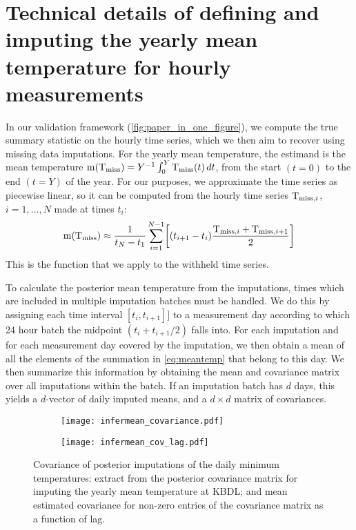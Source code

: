 \section{Technical details of defining and imputing the yearly mean temperature for hourly measurements}
\label{appendix:infermean_details}

In our validation framework (\autoref{fig:paper_in_one_figure}), we compute the true summary statistic
on the hourly time series, which we then aim to recover using missing data imputations.
For the yearly mean temperature, the estimand is the mean temperature $\operatorname{m}(\mathrm{T}_{\mathrm{miss}})=Y^{-1} \int_0^Y \mathrm{T}_{\mathrm{miss}}(t) \mathop{d t}$,
from the start $(t=0)$ to the end $(t=Y)$ of the year.
For our purposes, we approximate the time series as piecewise linear,
so it can be computed from the hourly time series \(\mathrm{T}_{\mathrm{miss},i}\), \(i=1,\dotsc,N\) made at times \(t_i\):
\begin{equation}
    \mean(\Temp_\miss) \approx \frac{1}{t_N - t_1} \sum_{i=1}^{N-1} \sbr{(t_{i+1}-t_i) \frac{\Temp_{\miss,i}+\Temp_{\miss,i+1}}{2}}
    \label{eq:meantemp}
\end{equation}
This is the function that we apply to the withheld time series.

To calculate the posterior mean temperature from the imputations,
times which are included in multiple imputation batches must be handled.
We do this by assigning each time interval $[t_{i},t_{i+1}]]$ to a measurement day
according to which 24 hour batch the midpoint $(t_i+t_{i+1}/2)$ falls into.
For each imputation and for each measurement day covered by the imputation, 
we then obtain a mean of all the elements of the summation in \autoref{eq:meantemp}
that belong to this day.
We then summarize this information by obtaining the mean and covariance matrix
over all imputations within the batch.
If an imputation batch has $d$ days, this yields a $d$-vector of daily imputed means,
and a $d \times d$ matrix of covariances.

\begin{figure}[t]
    \centering
    \begin{subfigure}[t]{0.45\textwidth}
    \texttt{[image: infermean\_covariance.pdf]}
    \caption{
             \label{fig:infermean_subcov}
            }
    \end{subfigure}
    \begin{subfigure}[t]{0.35\textwidth}
    \texttt{[image: infermean\_cov\_lag.pdf]}
    \caption{
             \label{fig:infermean_cov_lag}
            }
    \end{subfigure}
    \caption{
        \label{fig:infermean_covariance}
        Covariance of posterior imputations of the daily minimum temperatures:
        extract from the posterior covariance matrix for imputing the yearly
            mean temperature at KBDL; and
        mean estimated covariance for non-zero entries of the covariance matrix
            as a function of lag.
    }
\end{figure}

